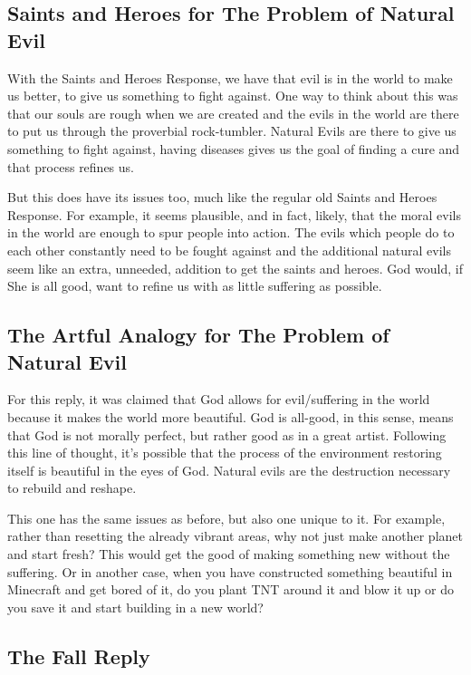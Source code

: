 \subsection{Saints and Heroes for The Problem of Natural Evil}

With the Saints and Heroes Response, we have that evil is in the world to make us better, to give us something to fight against. One way to think about this was that our souls are rough when we are created and the evils in the world are there to put us through the proverbial rock-tumbler. Natural Evils are there to give us something to fight against, having diseases gives us the goal of finding a cure and that process refines us. 

But this does have its issues too, much like the regular old Saints and Heroes Response. For example, it seems plausible, and in fact, likely, that the moral evils in the world are enough to spur people into action. The evils which people do to each other constantly need to be fought against and the additional natural evils seem like an extra, unneeded, addition to get the saints and heroes. God would, if She is all good, want to refine us with as little suffering as possible. 
\subsection{The Artful Analogy for The Problem of Natural Evil} 

For this reply, it was claimed that God allows for evil/suffering in the world because it makes the world more beautiful. God is all-good, in this sense, means that God is not morally perfect, but rather good as in a great artist. Following this line of thought, it's possible that the process of the environment restoring itself is beautiful in the eyes of God. Natural evils are the destruction necessary to rebuild and reshape.

This one has the same issues as before, but also one unique to it. For example, rather than resetting the already vibrant areas, why not just make another planet and start fresh? This would get the good of making something new without the suffering. Or in another case, when you have constructed something beautiful in Minecraft and get bored of it, do you plant TNT around it and blow it up or do you save it and start building in a new world? 

\subsection{The Fall Reply}


